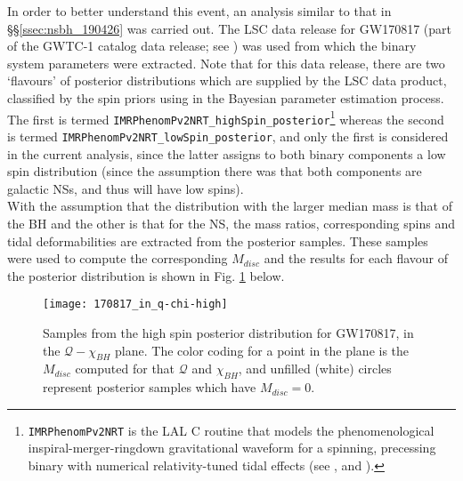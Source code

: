         In order to better understand this event, an analysis similar to that in
        \S\S\ref{ssec:nsbh_190426} was carried out. The LSC data release for GW170817
        (part of the GWTC-1 catalog data release; see \cite{gwtc1_DR}) was used from
        which the binary system parameters were extracted. Note that for this data
        release, there are two `flavours' of posterior distributions which are supplied
        by the LSC data product, classified by the spin priors using in the Bayesian
        parameter estimation process.  The first is termed
        \texttt{IMRPhenomPv2NRT\_highSpin\_posterior}\footnote
        {
            \texttt{IMRPhenomPv2NRT} is the LAL C routine that models the
            phenomenological inspiral-merger-ringdown gravitational waveform for a
            spinning, precessing binary with numerical relativity-tuned tidal effects
            (see \cite{lalsuite}, and \cite{dietrich_2019}).
        }
        whereas the second is termed \texttt{IMRPhenomPv2NRT\_lowSpin\_posterior}, and
        only the first is considered in the current analysis, since the latter assigns
        to both binary components a low spin distribution (since the assumption there
        was that both components are galactic NSs, and thus will have low spins).\\
        With the assumption that the distribution with the larger median mass is that of
        the BH and the other is that for the NS, the mass ratios, corresponding spins
        and tidal deformabilities are extracted from the posterior samples. These
        samples were used to compute the corresponding $M_{disc}$ and the results for
        each flavour of the posterior distribution is shown in Fig.
        \ref{fig:170817_high} below.

        \begin{figure}[ht]
            \centering
            \texttt{[image: 170817\_in\_q-chi-high]}
            \caption[$M_{disc}$ for GW170817's High Spin Posterior Distribution]
            {
                Samples from the high spin posterior distribution for GW170817, in the
                $\mathcal{Q}-\chi_{BH}$ plane. The color coding for a point in the plane
                is the $M_{disc}$ computed for that $\mathcal{Q}$ and $\chi_{BH}$, and
                unfilled (white) circles represent posterior samples which have
                $M_{disc} = 0$.
            }
            \label{fig:170817_high}
        \end{figure}

